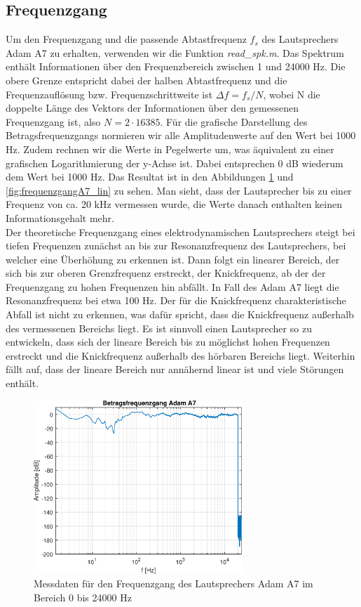 \subsection{Frequenzgang}
\label{subsec:b}
Um den Frequenzgang und die passende Abtastfrequenz $f_s$ des Lautsprechers Adam A7 zu erhalten, verwenden wir die Funktion \textit{read\_spk.m}.
Das Spektrum enthält Informationen über den Frequenzbereich zwischen 1 und 24000 Hz.
Die obere Grenze entspricht dabei der halben Abtastfrequenz und die Frequenzauflösung bzw. Frequenzschrittweite ist $\Delta f = f_s / N$, wobei N die doppelte Länge des Vektors der Informationen über den gemessenen Frequenzgang ist, also $N = 2 \cdot 16385$.
Für die grafische Darstellung des Betragsfrequenzgangs normieren wir alle Amplitudenwerte auf den Wert bei 1000 Hz.
Zudem rechnen wir die Werte in Pegelwerte um, was äquivalent zu einer grafischen Logarithmierung der y-Achse ist.
Dabei entsprechen 0 dB wiederum dem Wert bei 1000 Hz.
Das Resultat ist in den Abbildungen \ref{fig:frequenzgangA7} und \ref{fig:frequenzgangA7_lin} zu sehen. 
Man sieht, dass der Lautsprecher bis zu einer Frequenz von ca. 20 kHz vermessen wurde, die Werte danach enthalten keinen Informationsgehalt mehr.\\
Der theoretische Frequenzgang eines elektrodynamischen Lautsprechers steigt bei tiefen Frequenzen zunächst an bis zur Resonanzfrequenz des Lautsprechers, bei welcher eine Überhöhung zu erkennen ist.
Dann folgt ein linearer Bereich, der sich bis zur oberen Grenzfrequenz erstreckt, der Knickfrequenz, ab der der Frequenzgang zu hohen Frequenzen hin abfällt. 
In Fall des Adam A7 liegt die Resonanzfrequenz bei etwa 100 Hz.
Der für die Knickfrequenz charakteristische Abfall ist nicht zu erkennen, was dafür spricht, dass die Knickfrequenz außerhalb des vermessenen Bereichs liegt.
Es ist sinnvoll einen Lautsprecher so zu entwickeln, dass sich der lineare Bereich bis zu möglichst hohen Frequenzen erstreckt und die Knickfrequenz außerhalb des hörbaren Bereichs liegt.
Weiterhin fällt auf, dass der lineare Bereich nur annähernd linear ist und viele Störungen enthält.\\

\begin{figure}[H]
        \centering
        \includegraphics[width=0.7\textwidth]{Figures/frequenzgangA7.eps}
        \caption{Messdaten für den Frequenzgang des Lautsprechers Adam A7 im Bereich 0 bis 24000 Hz}
        \label{fig:frequenzgangA7}
\end{figure}

